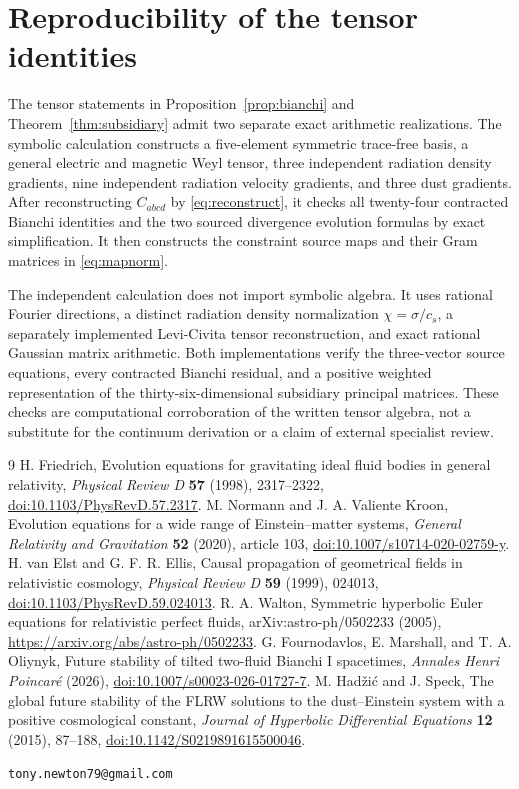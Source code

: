 \documentclass[10pt,a4paper]{article}
\begin{document}
\section{Reproducibility of the tensor identities}\label{app:verification}
The tensor statements in Proposition~\ref{prop:bianchi} and Theorem~\ref{thm:subsidiary} admit two separate exact arithmetic realizations. The symbolic calculation constructs a five-element symmetric trace-free basis, a general electric and magnetic Weyl tensor, three independent radiation density gradients, nine independent radiation velocity gradients, and three dust gradients. After reconstructing $C_{abcd}$ by \eqref{eq:reconstruct}, it checks all twenty-four contracted Bianchi identities and the two sourced divergence evolution formulas by exact simplification. It then constructs the constraint source maps and their Gram matrices in \eqref{eq:mapnorm}.

The independent calculation does not import symbolic algebra. It uses rational Fourier directions, a distinct radiation density normalization $\chi=\sigma/c_s$, a separately implemented Levi-Civita tensor reconstruction, and exact rational Gaussian matrix arithmetic. Both implementations verify the three-vector source equations, every contracted Bianchi residual, and a positive weighted representation of the thirty-six-dimensional subsidiary principal matrices. These checks are computational corroboration of the written tensor algebra, not a substitute for the continuum derivation or a claim of external specialist review.

\begin{thebibliography}{9}
 H. Friedrich, Evolution equations for gravitating ideal fluid bodies in general relativity, \emph{Physical Review D} \textbf{57} (1998), 2317--2322, \href{https://doi.org/10.1103/PhysRevD.57.2317}{doi:10.1103/PhysRevD.57.2317}.
 M. Normann and J. A. Valiente Kroon, Evolution equations for a wide range of Einstein--matter systems, \emph{General Relativity and Gravitation} \textbf{52} (2020), article 103, \href{https://doi.org/10.1007/s10714-020-02759-y}{doi:10.1007/s10714-020-02759-y}.
 H. van Elst and G. F. R. Ellis, Causal propagation of geometrical fields in relativistic cosmology, \emph{Physical Review D} \textbf{59} (1999), 024013, \href{https://doi.org/10.1103/PhysRevD.59.024013}{doi:10.1103/PhysRevD.59.024013}.
 R. A. Walton, Symmetric hyperbolic Euler equations for relativistic perfect fluids, arXiv:astro-ph/0502233 (2005), \url{https://arxiv.org/abs/astro-ph/0502233}.
 G. Fournodavlos, E. Marshall, and T. A. Oliynyk, Future stability of tilted two-fluid Bianchi I spacetimes, \emph{Annales Henri Poincar\'e} (2026), \href{https://doi.org/10.1007/s00023-026-01727-7}{doi:10.1007/s00023-026-01727-7}.
 M. Had\v{z}i\'c and J. Speck, The global future stability of the FLRW solutions to the dust--Einstein system with a positive cosmological constant, \emph{Journal of Hyperbolic Differential Equations} \textbf{12} (2015), 87--188, \href{https://doi.org/10.1142/S0219891615500046}{doi:10.1142/S0219891615500046}.
\end{thebibliography}
\vspace{1em}
\noindent\texttt{tony.newton79@gmail.com}
\end{document}
